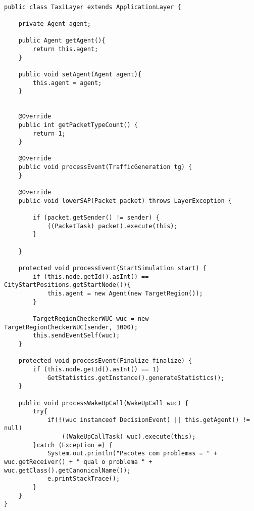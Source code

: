 \begin{lstlisting}

public class TaxiLayer extends ApplicationLayer {

	private Agent agent;
	
	public Agent getAgent(){
		return this.agent;
	}
	
	public void setAgent(Agent agent){
		this.agent = agent;
	}


	@Override
	public int getPacketTypeCount() {
		return 1;
	}
	
	@Override
	public void processEvent(TrafficGeneration tg) {
	}

	@Override
	public void lowerSAP(Packet packet) throws LayerException {

		if (packet.getSender() != sender) {
			((PacketTask) packet).execute(this);
		}
		
	}

	protected void processEvent(StartSimulation start) {
		if (this.node.getId().asInt() == CityStartPositions.getStartNode()){
			this.agent = new Agent(new TargetRegion());
		}
	
		TargetRegionCheckerWUC wuc = new TargetRegionCheckerWUC(sender, 1000);
		this.sendEventSelf(wuc);
	}

	protected void processEvent(Finalize finalize) {
		if (this.node.getId().asInt() == 1)
			GetStatistics.getInstance().generateStatistics();
	}

	public void processWakeUpCall(WakeUpCall wuc) {
		try{
			if(!(wuc instanceof DecisionEvent) || this.getAgent() != null)
				((WakeUpCallTask) wuc).execute(this);
		}catch (Exception e) {
			System.out.println("Pacotes com problemas = " + wuc.getReceiver() + " qual o problema " + wuc.getClass().getCanonicalName());
			e.printStackTrace();
		}
	}
}
\end{lstlisting}
